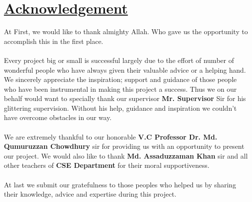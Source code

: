 \pagebreak

\section*{\underline{Acknowledgement}}
At First, we would like to thank almighty Allah. Who gave us the opportunity to accomplish this in the first place. \\
\vspace{10pt}
\\Every project big or small is successful largely due to the effort of number of wonderful people who have always given their valuable advice or a helping hand. We sincerely appreciate the inspiration; support and guidance of those people who have been instrumental in making this project a success. Thus we on our behalf would want to specially thank our supervisor \textbf{Mr. Supervisor} Sir for his glittering supervision. Without his help, guidance and inspiration we couldn't have overcome obstacles in our way. \\
\vspace{10pt}
\\We are extremely thankful to our honorable \textbf{V.C Professor Dr. Md. Qumuruzzan Chowdhury} sir for providing us with an opportunity to present our project. We would also like to thank \textbf{Md. Assaduzzaman Khan} sir and all other teachers of \textbf{CSE Department} for their moral supportiveness. \\
\vspace{10pt}
\\At last we submit our gratefulness to those peoples who helped us by sharing their knowledge, advice and expertise during this project.

\pagebreak